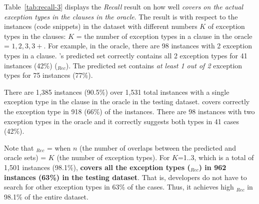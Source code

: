 Table~\ref{tab:recall-3} displays the {\em Recall} result on how well
{\em {\tool} covers on the actual exception types in the 
  clauses in the oracle}. The result is with respect to the instances
(code snippets) in the dataset with different numbers $K$ of exception
types in the  clauses: $K$ = the number of exception types
in a  clause in the oracle = $1,2,3,3+$. For example, in
the oracle, there are 98 instances with 2 exception types in a
 clause. {\tool}'s predicted set correctly contains all 2
exception types for 41 instances (42\%) ($_{Rec}$). The
predicted set contains {\em at least 1 out of 2} exception types for
75 instances (77\%).





There are 1,385 instances (90.5\%) over 1,531 total instances with a
single exception type in the  clause in the oracle in the
testing dataset. {\tool} covers correctly the exception type in 918
(66\%) of the instances. There are 98 instances with two exception
types in the oracle and it correctly suggests both types in 41 cases
(42\%).



Note that $_{Rec}$ =  when $n$ (the number
of overlaps between the predicted and oracle sets) = $K$ (the number
of exception types). For $K$=1..3, which is a total of 1,501
instances (98.1\%), {\bf {\tool} covers all the exception types
  ($_{Rec}$) in 962 instances (63\%) in the testing dataset}. That is,
developers do not have to search for other exception types in 63\% of
the cases. Thus, it achieves high $_{Rec}$ in 98.1\% of
  the entire dataset.

